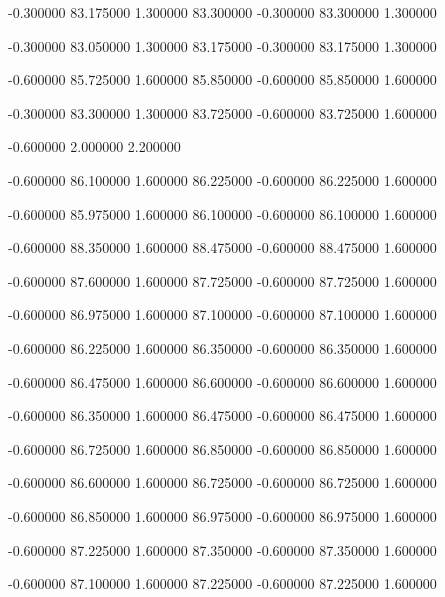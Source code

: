  {-0.300000} {83.175000} {1.300000} {83.300000} {-0.300000} {83.300000} {1.300000}

 {-0.300000} {83.050000} {1.300000} {83.175000} {-0.300000} {83.175000} {1.300000}

 {-0.600000} {85.725000} {1.600000} {85.850000} {-0.600000} {85.850000} {1.600000}

 {-0.300000} {83.300000} {1.300000} {83.725000} {-0.600000} {83.725000} {1.600000}

 {-0.600000} {2.000000} {2.200000}

 {-0.600000} {86.100000} {1.600000} {86.225000} {-0.600000} {86.225000} {1.600000}

 {-0.600000} {85.975000} {1.600000} {86.100000} {-0.600000} {86.100000} {1.600000}

 {-0.600000} {88.350000} {1.600000} {88.475000} {-0.600000} {88.475000} {1.600000}

 {-0.600000} {87.600000} {1.600000} {87.725000} {-0.600000} {87.725000} {1.600000}

 {-0.600000} {86.975000} {1.600000} {87.100000} {-0.600000} {87.100000} {1.600000}

 {-0.600000} {86.225000} {1.600000} {86.350000} {-0.600000} {86.350000} {1.600000}

 {-0.600000} {86.475000} {1.600000} {86.600000} {-0.600000} {86.600000} {1.600000}

 {-0.600000} {86.350000} {1.600000} {86.475000} {-0.600000} {86.475000} {1.600000}

 {-0.600000} {86.725000} {1.600000} {86.850000} {-0.600000} {86.850000} {1.600000}

 {-0.600000} {86.600000} {1.600000} {86.725000} {-0.600000} {86.725000} {1.600000}

 {-0.600000} {86.850000} {1.600000} {86.975000} {-0.600000} {86.975000} {1.600000}

 {-0.600000} {87.225000} {1.600000} {87.350000} {-0.600000} {87.350000} {1.600000}

 {-0.600000} {87.100000} {1.600000} {87.225000} {-0.600000} {87.225000} {1.600000}


